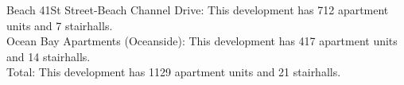 {Beach 41St Street-Beach Channel Drive}: This development has 712 apartment units and 7 stairhalls.\\{Ocean Bay Apartments (Oceanside)}: This development has 417 apartment units and 14 stairhalls.\\{Total}: This development has 1129 apartment units and 21 stairhalls.\\